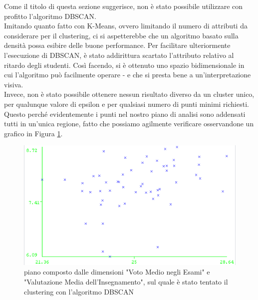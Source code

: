     Come il titolo di questa sezione suggerisce, non è stato possibile utilizzare con profitto l'algoritmo DBSCAN. \\

    Imitando quanto fatto con K-Means, ovvero limitando il numero di attributi da considerare per il clustering, ci si aspetterebbe che un algoritmo basato sulla densità possa esibire delle buone performance. Per facilitare ulteriormente l'esecuzione di DBSCAN, è stato addirittura scartato l'attributo relativo al ritardo degli studenti. Così facendo, si è ottenuto uno spazio bidimensionale in cui l'algoritmo può facilmente operare - e che si presta bene a un'interpretazione visiva. \\

    Invece, non è stato possibile ottenere nessun risultato diverso da un cluster unico, per qualunque valore di epsilon e per qualsiasi numero di punti minimi richiesti. Questo perché evidentemente i punti nel nostro piano di analisi sono addensati tutti in un'unica regione, fatto che possiamo agilmente verificare osservandone un grafico in Figura \ref{dbscan}.

    \begin{figure}
        \centering
        \caption{piano composto dalle dimensioni "Voto Medio negli Esami" e "Valutazione Media dell'Insegnamento", sul quale è stato tentato il clustering con l'algoritmo DBSCAN}
        \label{dbscan}
        \includegraphics[scale=0.75]{../cluster/dbscan.png}
    \end{figure}
